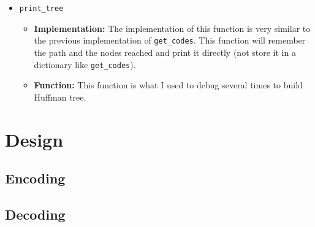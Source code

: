 \documentclass{article}
\begin{document}
\begin{itemize}
    \item \texttt{print\_tree}
        \begin {itemize}
            \item \textbf{Implementation:} The implementation of this function is very similar to the previous implementation of \texttt{get\_codes}. This function will remember the path and the nodes reached and print it directly (not store it in a dictionary like \texttt{get\_codes}).
            \item \textbf{Function:} This function is what I used to debug several times to build Huffman tree.
        \end{itemize}
\end{itemize}

\section{Design}
    \subsection{Encoding}

    \subsection{Decoding}
    
\end{document}
